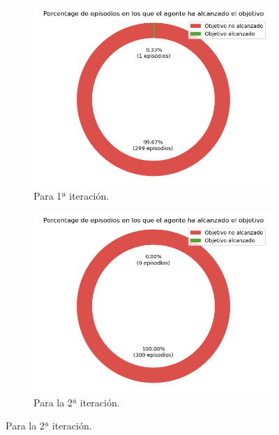 \begin{figure}
    \centering
    \begin{subfigure}{.5\textwidth}
        \centering
        \includegraphics[scale=0.3]{cap5_experimentacion/images/CHANGE_GOAL-20-09_21-06-42_it1_porcentajeResuelto.png}
        \caption{Para 1ª iteración.}
        \label{fig:CHANGE_GOAL-20-09_21-06-42_it1_porcentajeResuelto}
    \end{subfigure}%
    \begin{subfigure}{.5\textwidth}
        \centering
        \includegraphics[scale=0.3]{cap5_experimentacion/images/CHANGE_GOAL-20-09_21-06-42_it2_porcentajeResuelto.png}
        \caption{Para la 2ª iteración.}
        \label{fig:CHANGE_GOAL-20-09_21-06-42_it2_porcentajeResuelto}

\end{subfigure}
\end{figure}

